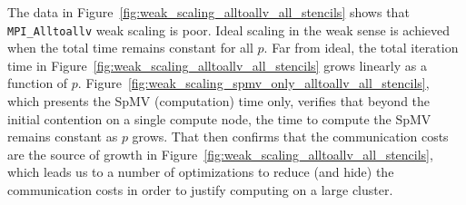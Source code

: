 \documentclass{report}
\begin{document}
The data in Figure~\ref{fig:weak_scaling_alltoallv_all_stencils} shows that \texttt{MPI\_Alltoallv} weak scaling is poor. Ideal scaling in the weak sense is achieved when the total time remains constant for all $p$. Far from ideal, the total iteration time in Figure~\ref{fig:weak_scaling_alltoallv_all_stencils} grows linearly as a function of $p$. Figure~\ref{fig:weak_scaling_spmv_only_alltoallv_all_stencils}, which presents the SpMV (computation) time only, verifies that beyond the initial contention on a single compute node, the time to compute the SpMV remains constant as $p$ grows. That then confirms that the communication costs are the source of growth in Figure~\ref{fig:weak_scaling_alltoallv_all_stencils}, which leads us to a number of optimizations to reduce (and hide) the communication costs in order to justify computing on a large cluster. 
\end{document}
